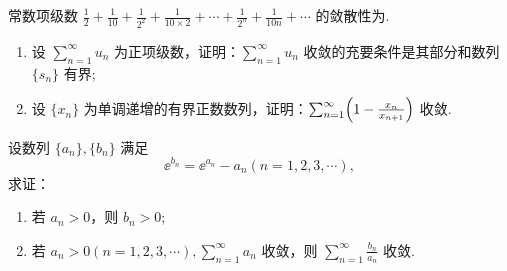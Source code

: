 	\begin{ti}
		常数项级数 $\frac{1}{2} + \frac{1}{10} + \frac{1}{2^{2}} + \frac{1}{10 \times 2} + \cdots + \frac{1}{2^{n}} + \frac{1}{10n} + \cdots$ 的敛散性为\htwo.
	\end{ti}

	\begin{ti}
		\begin{enumerate}
			\item 设 $\sum_{n=1}^{\infty} u_{n}$ 为正项级数，证明：$\sum_{n=1}^{\infty} u_{n}$ 收敛的充要条件是其部分和数列 $\{ s_{n} \}$ 有界;
			\item 设 $\{ x_{n} \}$ 为单调递增的有界正数数列，证明：$\sum_{n=1}^{\infty} \Bigl( 1 - \frac{x_{n}}{x_{n+1}} \Bigr)$ 收敛.
		\end{enumerate}
	\end{ti}

	\begin{ti}
		设数列 $\{ a_{n} \}, \{ b_{n} \}$ 满足
		\[
			\ee^{b_{n}} = \ee^{a_{n}} - a_{n} (n = 1,2,3,\cdots),
		\]
		求证：
		\begin{enumerate}
			\item 若 $a_{n} > 0$，则 $b_{n} > 0$;
			\item 若 $a_{n} > 0(n = 1,2,3,\cdots), \sum_{n=1}^{\infty} a_{n}$ 收敛，则 $\sum_{n=1}^{\infty} \frac{b_{n}}{a_{n}}$ 收敛.
		\end{enumerate}
	\end{ti}
